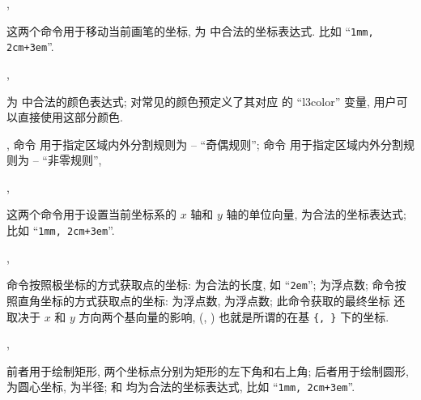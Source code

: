 \documentclass[
  hyper, lang=cn, 
  class=l3dox, 
]{../../zlatex/code/ztex}
\begin{document}
\begin{function}[added=2025-05-15]{\zmoveto, \zlineto}
  \begin{syntax}
  \end{syntax}
  这两个命令用于移动当前画笔的坐标,  为  中合法的坐标表达式.
  比如 ``\texttt{1mm, 2cm+3em}''.
\end{function}


\begin{function}[added=2025-05-15]{\zscolor, \zfcolor}
  \begin{syntax}
  \end{syntax}
   为  中合法的颜色表达式; \ztikz{} 对常见的颜色预定义了其对应
  的 ``l3color'' 变量, 用户可以直接使用这部分颜色.
\end{function}


\begin{function}[added=2025-05-31]{\zfevenodd, \zfnozero}
  命令  用于指定区域内外分割规则为 -- ``奇偶规则'';
  命令  用于指定区域内外分割规则为 -- ``非零规则'', 
\end{function}


\begin{function}[added=2025-05-15]{\zxvec, \zyvec}
  \begin{syntax}
  \end{syntax}
  这两个命令用于设置当前坐标系的 $x$ 轴和 $y$ 轴的单位向量,  为合法的坐标表达式;
  比如 ``\texttt{1mm, 2cm+3em}''.
\end{function}


\begin{function}[added=2025-05-15]{\zpolar, \zcoor}
  \begin{syntax}
  \end{syntax}
   命令按照极坐标的方式获取点的坐标: 为合法的长度, 如 ``\texttt{2em}'';  为浮点数; 
   命令按照直角坐标的方式获取点的坐标:  为浮点数,  为浮点数; 此命令获取的最终坐标
  还取决于 $x$ 和 $y$ 方向两个基向量的影响, (, ) 也就是所谓的在基 \texttt{\{, \}} 
  下的坐标.
\end{function}


\begin{function}[added=2025-05-15]{\zrect, \zcirc}
  \begin{syntax}
  \end{syntax}
  前者用于绘制矩形, 两个坐标点分别为矩形的左下角和右上角; 后者用于绘制圆形,  为圆心坐标,  为半径;
   和  均为合法的坐标表达式, 比如 ``\texttt{1mm, 2cm+3em}''.
\end{function}
\end{document}
